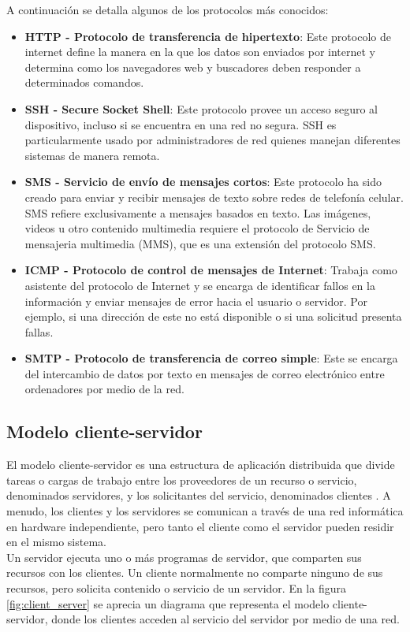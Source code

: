 A continuación se detalla algunos de los protocolos más conocidos:
\begin{itemize}
    \item \textbf{HTTP - Protocolo de transferencia de hipertexto}: Este protocolo de internet define la manera en la que los datos son enviados por internet y determina como los navegadores web y buscadores deben responder a determinados comandos.
    \item \textbf{SSH - Secure Socket Shell}: Este protocolo provee un acceso seguro al dispositivo, incluso si se encuentra en una red no segura. SSH es particularmente usado por administradores de red quienes manejan diferentes sistemas de manera remota.
    \item \textbf{SMS - Servicio de envío de mensajes cortos}: Este protocolo ha sido creado para enviar y recibir mensajes de texto sobre redes de telefonía celular. SMS refiere exclusivamente a mensajes basados en texto. Las imágenes, videos u otro contenido multimedia requiere el protocolo de Servicio de mensajeria multimedia (MMS), que es una extensión del protocolo SMS.
    \item \textbf{ICMP - Protocolo de control de mensajes de Internet}: Trabaja como asistente del protocolo de Internet y se encarga de identificar fallos en la información y enviar mensajes de error hacia el usuario o servidor. Por ejemplo, si una dirección de este no está disponible o si una solicitud presenta fallas.
    \item \textbf{SMTP - Protocolo de transferencia de correo simple}: Este se encarga del intercambio de datos por texto en mensajes de correo electrónico entre ordenadores por medio de la red.
\end{itemize}

\subsection{Modelo cliente-servidor}
El modelo cliente-servidor es una estructura de aplicación distribuida que divide tareas o cargas de trabajo entre los proveedores de un recurso o servicio, denominados servidores, y los solicitantes del servicio, denominados clientes \cite{wikipedia:cliente_servidor}. A menudo, los clientes y los servidores se comunican a través de una red informática en hardware independiente, pero tanto el cliente como el servidor pueden residir en el mismo sistema.\\

Un servidor ejecuta uno o más programas de servidor, que comparten sus recursos con los clientes. Un cliente normalmente no comparte ninguno de sus recursos, pero solicita contenido o servicio de un servidor. En la figura \ref{fig:client_server} se aprecia un diagrama que representa el modelo cliente-servidor, donde los clientes acceden al servicio del servidor por medio de una red.\\

